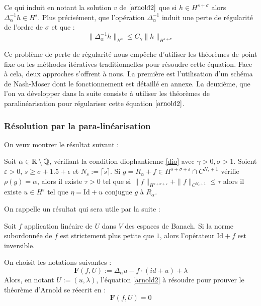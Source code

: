 \documentclass[11pt,a4paper]{article}
\begin{document}
Ce qui induit en notant la solution $v$ de $\eqref{arnold2}$ que si $h \in H^{s+\sigma}$ alors $\Delta_\alpha^{-1}h \in H^{s}$. Plus précisément, que l'opération $\Delta_{\alpha}^{-1}$ induit une perte de régularité de l'ordre de $\sigma$ et que :
\begin{equation}\label{dio}
\|\Delta_\alpha^{-1}h\|_{H^s} \leq C_\gamma \|h\|_{H^{s+\sigma}}
\end{equation}
\par
Ce problème de perte de régularité nous empêche d'utiliser les théorèmes de point fixe ou les méthodes itératives traditionnelles pour résoudre cette équation. Face à cela, deux approches s'offrent à nous. La première est l'utilisation d'un schéma de Nash-Moser dont le fonctionnement est détaillé en annexe. La deuxième, que l'on va développer dans la suite consiste à utiliser les théorèmes de paralinéarisation pour régulariser cette équation $\eqref{arnold2}$.
\subsubsection{Résolution par la para-linéarisation}
On veux montrer le résultat suivant :
\begin{thm}[Arnold]\label{arnold}
Soit $\alpha \in \mathbb R\setminus \mathbb Q$, vérifiant la condition diophantienne \eqref{dio} avec $\gamma > 0, \sigma > 1$. Soient $\varepsilon >0$, $s\geq \sigma + 1.5 + \epsilon$ et $N_s := \lceil s \rceil$. Si $g=R_\alpha + f \in H^{s+\sigma + \varepsilon}\cap C^{N_s+1}$ vérifie $\rho(g)=\alpha$, alors il existe $\tau > 0$ tel que si $\|f\|_{H^{s+\sigma + \varepsilon}} + \|f\|_ {C^{N_s+1}} \leq \tau$ alors il existe $u \in H^s$ tel que $\eta = \text{Id} + u$ conjugue $g$ à $R_\alpha$.
\end{thm}

On rappelle un résultat qui sera utile par la suite :
\begin{lemma}
Soit $f$ application linéaire de $U$ dans $V$ des espaces de Banach. Si la norme subordonnée de $f$ est strictement plus petite que $1$, alors l'opérateur $\text{Id} + f$ est inversible.
\end{lemma}

On choisit les notations suivantes :
\begin{equation*}
\mathbf{F}(f,U) :=\Delta_\alpha u - f \cdot (id +u) + \lambda
\end{equation*}
Alors, en notant $U:=(u,\lambda)$, l'équation \eqref{arnold2} à résoudre pour prouver le théorème d'Arnold se réecrit en :
\begin{equation}\label{equ_reso}
\mathbf{F}(f,U)=0
\end{equation} 
\end{document}
